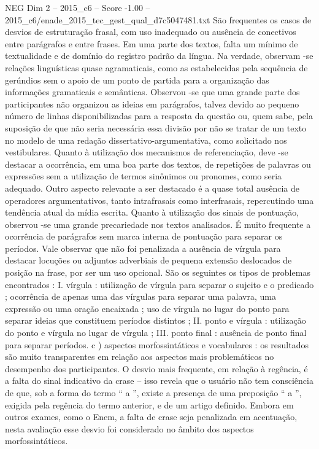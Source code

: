 \begin{textsample}{NEG Dim 2 – 2015\_c6 – Score -1.00 – 2015\_c6/enade\_2015\_tec\_gest\_qual\_d7c5047481.txt}
São frequentes os casos de desvios de estruturação frasal, com uso inadequado ou ausência de conectivos entre parágrafos e entre frases.
Em uma parte dos textos, falta um mínimo de textualidade e de domínio do registro padrão da língua.
Na verdade, observam -se relações linguísticas quase agramaticais, como as estabelecidas pela sequência de gerúndios sem o apoio de um ponto de partida para a organização das informações gramaticais e semânticas.
Observou -se que uma grande parte dos participantes não organizou as ideias em parágrafos, talvez devido ao pequeno número de linhas disponibilizadas para a resposta da questão ou, quem sabe, pela suposição de que não seria necessária essa divisão por não se tratar de um texto no modelo de uma redação dissertativo-argumentativa, como solicitado nos vestibulares.
Quanto à utilização dos mecanismos de referenciação, deve -se destacar a ocorrência, em uma boa parte dos textos, de repetições de palavras ou expressões sem a utilização de termos sinônimos ou pronomes, como seria adequado.
Outro aspecto relevante a ser destacado é a quase total ausência de operadores argumentativos, tanto intrafrasais como interfrasais, repercutindo uma tendência atual da mídia escrita.
Quanto à utilização dos sinais de pontuação, observou -se uma grande precariedade nos textos analisados.
É muito frequente a ocorrência de parágrafos sem marca interna de pontuação para separar os períodos.
Vale observar que não foi penalizada a ausência de vírgula para destacar locuções ou adjuntos adverbiais de pequena extensão deslocados de posição na frase, por ser um uso opcional.
São os seguintes os tipos de problemas encontrados : I. vírgula : utilização de vírgula para separar o sujeito e o predicado ; ocorrência de apenas uma das vírgulas para separar uma palavra, uma expressão ou uma oração encaixada ; uso de vírgula no lugar do ponto para separar ideias que constituem períodos distintos ; II. ponto e vírgula : utilização do ponto e vírgula no lugar de vírgula ; III. ponto final : ausência de ponto final para separar períodos. c ) aspectos morfossintáticos e vocabulares : os resultados são muito transparentes em relação aos aspectos mais problemáticos no desempenho dos participantes.
O desvio mais frequente, em relação à regência, é a falta do sinal indicativo da crase – isso revela que o usuário não tem consciência de que, sob a forma do termo “ a ”, existe a presença de uma preposição “ a ”, exigida pela regência do termo anterior, e de um artigo definido.
Embora em outros exames, como o Enem, a falta de crase seja penalizada em acentuação, nesta avaliação esse desvio foi considerado no âmbito dos aspectos morfossintáticos.

\end{textsample}
